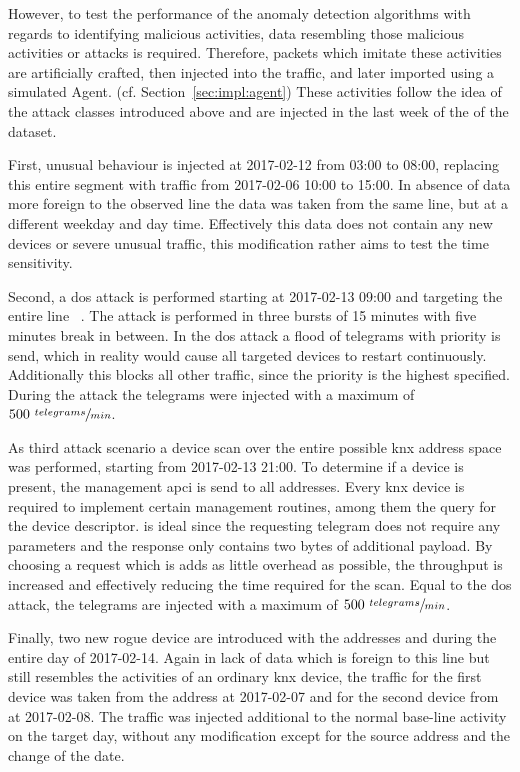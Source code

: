 However, to test the performance of the anomaly detection algorithms with regards to identifying malicious activities, data resembling those malicious activities or attacks is required.
Therefore, packets which imitate these activities are artificially crafted, then injected into the traffic, and later imported using a simulated Agent. (cf. Section~\ref{sec:impl:agent})
These activities follow the idea of the attack classes introduced above and are injected in the last week of the of the dataset.

First, unusual behaviour is injected at 2017-02-12 from 03:00 to 08:00, replacing this entire segment with traffic from 2017-02-06 10:00 to 15:00. In absence of data more foreign to the observed line the data was taken from the same line, but at a different weekday and day time. Effectively this data does not contain any new devices or severe unusual traffic, this modification rather aims to test the time sensitivity.

Second, a \gls{dos} attack is performed starting at 2017-02-13 09:00 and targeting the entire line ~. The attack is performed in three bursts of 15 minutes with five minutes break in between. In the \gls{dos} attack a flood of  telegrams with  priority is send, which in reality would cause all targeted devices to restart continuously. Additionally this blocks all other traffic, since the  priority is the highest specified. During the attack the telegrams were injected with a maximum of \(500 \ \sfrac{telegrams}{min}\).

As third attack scenario a device scan over the entire possible \gls{knx} address space was performed, starting from 2017-02-13 21:00.
To determine if a device is present, the management \gls{apci}  is send to all addresses. Every \gls{knx} device is required to implement certain management routines, among them the query for the device descriptor.  is ideal since the requesting telegram does not require any parameters and the response only contains two bytes of additional payload. By choosing a request which is adds as little overhead as possible, the throughput is increased and effectively reducing the time required for the scan. \parencite[cf.][p.~46]{DIN_EN_50090-4-1}
Equal to the \gls{dos} attack, the telegrams are injected with a maximum of \(500 \ \sfrac{telegrams}{min}\).

Finally, two new rogue device are introduced with the addresses  and  during the entire day of 2017-02-14.
Again in lack of data which is foreign to this line but still resembles the activities of an ordinary \gls{knx} device, the traffic for the first device was taken from the address  at 2017-02-07 and for the second device from  at 2017-02-08.
The traffic was injected additional to the normal base-line activity on the target day, without any modification except for the source address and the change of the date.

